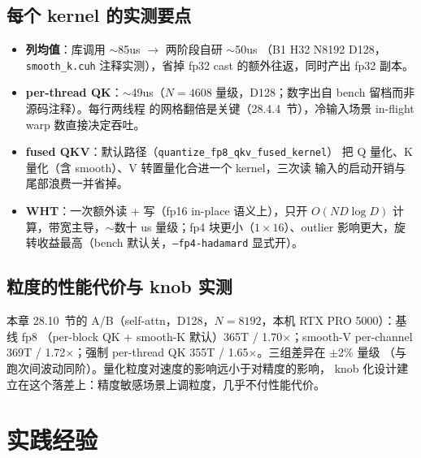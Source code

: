 \subsection{每个 kernel 的实测要点}

\begin{itemize}[itemsep=1pt,topsep=2pt]
  \item \textbf{列均值}：库调用 $\sim$85us $\to$ 两阶段自研 $\sim$50us
        （B1 H32 N8192 D128，\texttt{smooth\_k.cuh} 注释实测），省掉 fp32 cast
        的额外往返，同时产出 fp32 副本。
  \item \textbf{per-thread QK}：$\sim$49us（$N=4608$ 量级，D128；数字出自 bench
        留档而非源码注释）。每行两线程
        的网格翻倍是关键（28.4.4~节），冷输入场景 in-flight warp 数直接决定吞吐。
  \item \textbf{fused QKV}：默认路径（\texttt{quantize\_fp8\_qkv\_fused\_kernel}）
        把 Q 量化、K 量化（含 smooth）、V 转置量化合进一个 kernel，三次读
        输入的启动开销与尾部浪费一并省掉。
  \item \textbf{WHT}：一次额外读 + 写（fp16 in-place 语义上），只开 $O(N D\log D)$
        计算，带宽主导，$\sim$数十 us 量级；fp4 块更小（$1\times16$）、outlier
        影响更大，旋转收益最高（bench 默认关，\texttt{--fp4-hadamard} 显式开）。
\end{itemize}

\subsection{粒度的性能代价与 knob 实测}

本章 28.10~节的 A/B（self-attn，D128，$N=8192$，本机 RTX PRO 5000）：基线 fp8
（per-block QK + smooth-K 默认）365T / 1.70$\times$；smooth-V per-channel 369T /
1.72$\times$；强制 per-thread QK 355T / 1.65$\times$。三组差异在 $\pm$2\% 量级
（与跑次间波动同阶）。量化粒度对速度的影响远小于对精度的影响，
knob 化设计建立在这个落差上：精度敏感场景上调粒度，几乎不付性能代价。

\section{实践经验}

